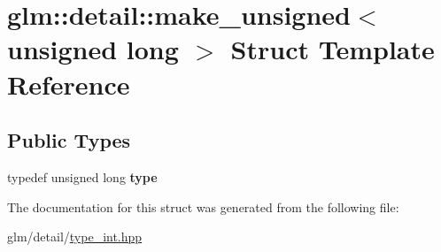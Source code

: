 \hypertarget{structglm_1_1detail_1_1make__unsigned_3_01unsigned_01long_01_4}{\section{glm\-:\-:detail\-:\-:make\-\_\-unsigned$<$ unsigned long $>$ Struct Template Reference}
\label{structglm_1_1detail_1_1make__unsigned_3_01unsigned_01long_01_4}
}
\subsection*{Public Types}
\begin{DoxyCompactItemize}
\item 
\hypertarget{structglm_1_1detail_1_1make__unsigned_3_01unsigned_01long_01_4_a8894ccd179135bda131b42cf10e58362}{typedef unsigned long {\bfseries type}}\label{structglm_1_1detail_1_1make__unsigned_3_01unsigned_01long_01_4_a8894ccd179135bda131b42cf10e58362}

\end{DoxyCompactItemize}


The documentation for this struct was generated from the following file\-:\begin{DoxyCompactItemize}
\item 
glm/detail/\hyperlink{type__int_8hpp}{type\-\_\-int.\-hpp}\end{DoxyCompactItemize}
